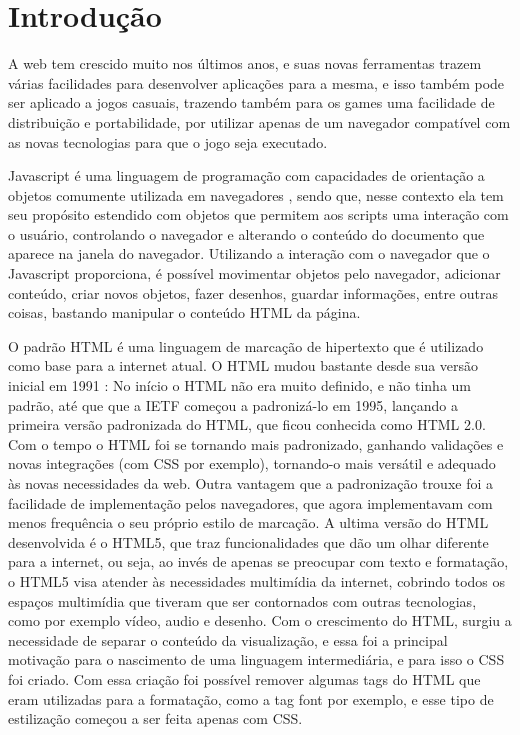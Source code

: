 \section{Introdução}

A web tem crescido muito nos últimos anos, e suas novas ferramentas trazem várias
facilidades para desenvolver aplicações para a mesma, e isso também pode ser aplicado
a jogos casuais, trazendo também para os games uma facilidade de distribuição e portabilidade,
por utilizar apenas de um navegador compatível com as novas tecnologias
para que o jogo seja executado.


Javascript é uma linguagem de programação com capacidades de orientação a objetos comumente utilizada em
navegadores \cite{flanagan2006javascript}, sendo que, nesse contexto ela tem seu propósito estendido com objetos que permitem
aos scripts uma interação com o usuário, controlando o navegador e alterando o conteúdo
do documento que aparece na janela do navegador.
Utilizando a interação com o navegador que o Javascript proporciona, é possível movimentar
objetos pelo navegador, adicionar conteúdo, criar novos objetos, fazer desenhos, guardar
informações, entre outras coisas, bastando manipular o conteúdo HTML da página.

O padrão HTML é uma linguagem de marcação de hipertexto que é utilizado como base para a internet
atual. O HTML mudou bastante desde sua versão inicial em 1991
\cite{powell2003html}: No início o HTML não era muito definido, e não tinha um padrão, até que que a
IETF começou a padronizá-lo em 1995, lançando a
primeira versão padronizada do HTML, que ficou conhecida como HTML 2.0.
Com o tempo o HTML foi se tornando mais padronizado, ganhando validações e novas integrações
(com CSS por exemplo), tornando-o mais versátil e adequado às novas necessidades da
web. Outra vantagem que a padronização trouxe foi a facilidade de implementação pelos
navegadores, que agora implementavam com menos frequência o seu próprio estilo de marcação.
A ultima versão do HTML desenvolvida é o HTML5, que traz funcionalidades que dão um
olhar diferente para a internet, ou seja, ao invés de apenas se preocupar com texto
e formatação, o HTML5 visa atender às necessidades multimídia da internet, cobrindo
todos os espaços multimídia que tiveram que ser contornados com outras tecnologias,
como por exemplo vídeo, audio e desenho.
Com o crescimento do HTML, surgiu a necessidade de separar o conteúdo
da visualização, e essa foi a principal motivação para o nascimento de
uma linguagem intermediária, e para isso o CSS foi criado.
Com essa criação foi possível remover algumas tags do HTML que eram utilizadas
para a formatação, como a tag font por exemplo, e esse tipo de
estilização começou a ser feita apenas com CSS.

